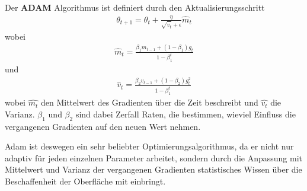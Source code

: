 \begin{definition}
    Der \textbf{ADAM} Algorithmus ist definiert durch
    den Aktualisierungsschritt
    \begin{align}
        \theta_{t+1} = \theta_t +\frac{\eta}{\sqrt{\hat{v}_t}+\epsilon}\hat{m}_t
    \end{align}
    wobei 
    \begin{align}
        \hat{m}_t = \frac{\beta_1 m_{t-1} + (1- \beta_1) g_t}{1-\beta^t_1}
    \end{align}
    und
    \begin{align}
        \hat{v}_t = \frac{\beta_2 v_{t-1} + (1- \beta_2) g_t^2}{1-\beta^t_1}
    \end{align}
    wobei $\hat{m_t}$ den Mittelwert des Gradienten über die Zeit beschreibt
    und $\hat{v_t}$ die Varianz. 
    $\beta_1$ und $\beta_2$ sind dabei Zerfall Raten, die bestimmen,
    wieviel Einfluss die vergangenen Gradienten auf den neuen Wert nehmen.
\end{definition}

Adam ist deswegen ein sehr beliebter Optimierungsalgorithmus, da er nicht nur 
adaptiv für jeden einzelnen Parameter arbeitet, sondern durch die Anpassung mit 
Mittelwert und Varianz der vergangenen Gradienten statistisches Wissen über
die Beschaffenheit der Oberfläche mit einbringt.

